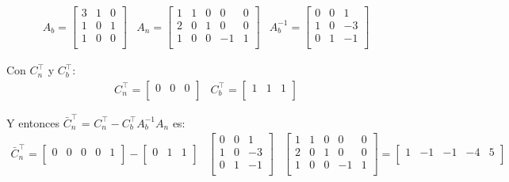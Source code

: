 \documentclass{article}
\begin{document}
\begin{flushleft}
		\begin{equation*}
			\begin{array}{ccc}
				A_b = \begin{bmatrix}
					3 & 1 & 0 \\
					1 & 0 & 1 \\
					1 & 0 & 0 \\
				\end{bmatrix} &
				A_n = \begin{bmatrix}
					1 & 1 & 0 & 0 & 0\\
					2 & 0 & 1 & 0 & 0 \\
					1 & 0 & 0 & -1 & 1  \\
				\end{bmatrix} &
				A_b^{-1} = \begin{bmatrix}
					0 & 0 & 1 \\
					1 & 0 & -3 \\
					0 & 1 & -1 \\
				\end{bmatrix}
			\end{array}
		\end{equation*}

		Con $C_n^\intercal$ y $C_b^\intercal$:
		\begin{equation*}
			\begin{array}{cc}
				C_n^\intercal = \begin{bmatrix}
					0 & 0 & 0\\
				\end{bmatrix} &
				C_b^\intercal = \begin{bmatrix}
					1 & 1 & 1 \\
				\end{bmatrix}
			\end{array}
		\end{equation*}

		Y entonces \(\bar{C}_n^\intercal\) = \(C_n^\intercal - C_b^\intercal A_b^{-1} A_n\) es:
		\begin{align*}
			\bar{C}_n^\intercal = \begin{bmatrix}
				0 & 0 & 0 & 0 & 1\\
			\end{bmatrix} - \begin{bmatrix}
				0 & 1 & 1 \\
			\end{bmatrix} & \begin{bmatrix}
				0 & 0 & 1 \\
				1 & 0 & -3 \\
				0 & 1 & -1 \\
			\end{bmatrix} & \begin{bmatrix}
				1 & 1 & 0 & 0 & 0\\
				2 & 0 & 1 & 0 & 0 \\
				1 & 0 & 0 & -1 & 1  \\
			\end{bmatrix} = \begin{bmatrix}
				1 & -1 & -1 & -4 & 5\\
			\end{bmatrix}
		\end{align*}


\end{flushleft}
\end{document}
